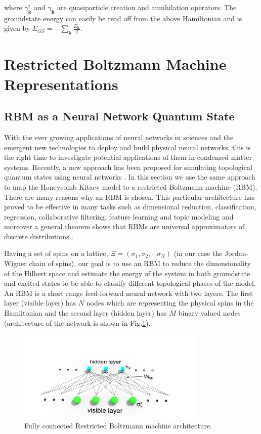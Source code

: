 \documentclass{article}
\begin{document}
\noindent where $\gamma^{\dagger}_{\mathbf{k}}$ and $\gamma_{\mathbf{k}}$ are quasiparticle creation and annihilation operators. The groundstate energy can easily be read off from the above Hamiltonian and is given by $E_{GS} = -\sum_{\mathbf{k}}\frac{E_\textbf{k}}{2}$.

\section{Restricted Boltzmann Machine Representations}\label{sec3}

\subsection{RBM as a Neural Network Quantum State}

With the ever growing applications of neural networks in sciences and the emergent new technologies to deploy and build physical neural networks, this is the right time to investigate potential applications of them in condensed matter systems. Recently, a new approach has been proposed for simulating topological quantum states using neural networks \cite{Deng_2017}. In this section we use the same approach to map the Honeycomb Kitaev model to a restricted Boltzmann machine (RBM). There are many reasons why an RBM is chosen. This particular architecture has proved to be effective in many tasks such as dimensional reduction, classification, regression, collaborative filtering, feature learning and topic modeling and moreover a general theorem shows that RBMs are universal approximators of discrete distributions \cite{LeRouxBengio}.

Having a set of spins on a lattice, $\Xi=(\sigma_{1},\sigma_{2},\cdots\sigma_{N})$ (in our case the Jordan-Wigner chain of spins), our goal is to use an RBM to reduce the dimensionality of the Hilbert space and estimate the energy of the system in both groundstate and excited states to be able to classify different topological phases of the model. An RBM is a short range feed-forward neural network with two layers. The first layer (visible layer) has $N$ nodes which are representing the physical spins in the Hamiltonian and the second layer (hidden layer) has $M$ binary valued nodes (architecture of the network is shown in Fig.\ref{rbm-arc}). 

\begin{figure}[!htb]
	\centering
	\includegraphics[width=0.8\textwidth]{./images/rbm}
	\caption{\label{rbm-arc} Fully connected Restricted Boltzmann machine architecture.}
\end{figure}
\end{document}
